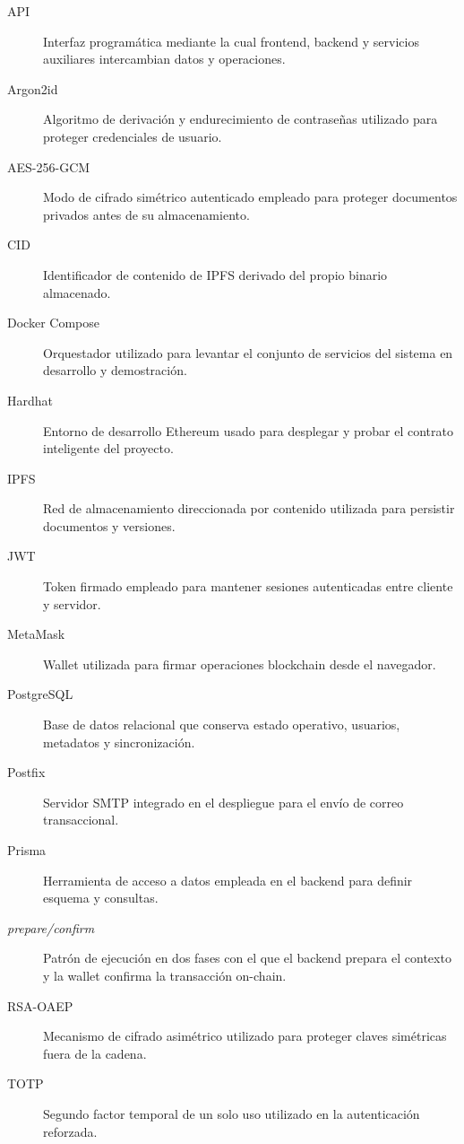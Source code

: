 \documentclass[11pt, a4paper]{article}
\begin{document}
\begin{description}
    \item[API] Interfaz programática mediante la cual frontend, backend y servicios auxiliares intercambian datos y operaciones.
    \item[Argon2id] Algoritmo de derivación y endurecimiento de contraseñas utilizado para proteger credenciales de usuario.
    \item[AES-256-GCM] Modo de cifrado simétrico autenticado empleado para proteger documentos privados antes de su almacenamiento.
    \item[CID] Identificador de contenido de IPFS derivado del propio binario almacenado.
    \item[Docker Compose] Orquestador utilizado para levantar el conjunto de servicios del sistema en desarrollo y demostración.
    \item[Hardhat] Entorno de desarrollo Ethereum usado para desplegar y probar el contrato inteligente del proyecto.
    \item[IPFS] Red de almacenamiento direccionada por contenido utilizada para persistir documentos y versiones.
    \item[JWT] Token firmado empleado para mantener sesiones autenticadas entre cliente y servidor.
    \item[MetaMask] Wallet utilizada para firmar operaciones blockchain desde el navegador.
    \item[PostgreSQL] Base de datos relacional que conserva estado operativo, usuarios, metadatos y sincronización.
    \item[Postfix] Servidor SMTP integrado en el despliegue para el envío de correo transaccional.
    \item[Prisma] Herramienta de acceso a datos empleada en el backend para definir esquema y consultas.
    \item[\textit{prepare/confirm}] Patrón de ejecución en dos fases con el que el backend prepara el contexto y la wallet confirma la transacción on-chain.
    \item[RSA-OAEP] Mecanismo de cifrado asimétrico utilizado para proteger claves simétricas fuera de la cadena.
    \item[TOTP] Segundo factor temporal de un solo uso utilizado en la autenticación reforzada.
\end{description}

\tableofcontents
\clearpage
\listoffigures
\clearpage
\listoftables
\clearpage

\hypersetup{pageanchor=true}
\setcounter{page}{1}
\end{document}
